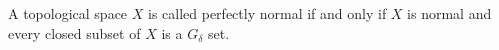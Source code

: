 A topological space $X$ is called perfectly normal if and only if $X$ is normal and every closed subset of $X$ is a $G_\delta$ set.
